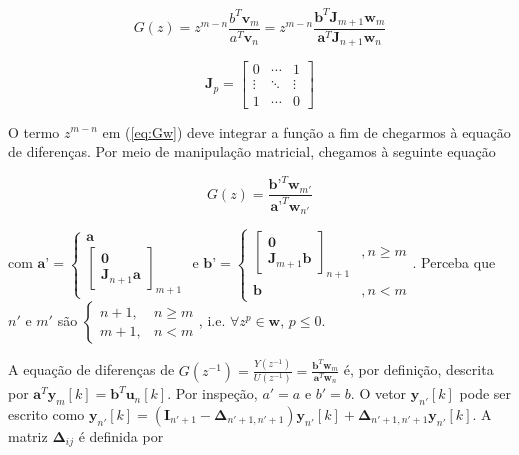 \documentclass[twoside, fleqn]{article}
\begin{document}
        \begin{equation}
            G(z) = z^{m-n}\frac{b^T \textbf{v}_m}{a^T \textbf{v}_n} = z^{m-n} \frac{\textbf{b}^T \textbf{J}_{m+1} \textbf{w}_m}{\textbf{a}^T \textbf{J}_{n+1} \textbf{w}_n}
        \label{eq:Gv}
        \end{equation}
    
        \begin{equation}
            \textbf{J}_p = 
            \begin{bmatrix}
                0&\cdots&1\\
                \vdots & \ddots & \vdots\\
                1&\cdots&0
            \end{bmatrix}
            \label{eq:exchange}
        \end{equation}
    
    O termo $z^{m-n}$ em (\ref{eq:Gw}) deve integrar a função a fim de chegarmos à equação de diferenças. Por meio de manipulação matricial, chegamos à seguinte equação 
    
        \begin{equation}
            G(z) = \frac{\textbf{b'}^T \textbf{w}_{m'}}{\textbf{a'}^T \textbf{w}_{n'}}
            \label{eq:Gw}
        \end{equation}
    
    com $\textbf{a'} = \begin{cases} \textbf{a}\\ \begin{bmatrix} \textbf{0} \\ \textbf{J}_{n+1} \textbf{a} \end{bmatrix}_{m+1} \end{cases} \mbox{ e } \textbf{b'} = \begin{cases} \begin{bmatrix} \textbf{0}\\ \textbf{J}_{m+1} \textbf{b} \end{bmatrix}_{n+1} &, n \geq m \\ \textbf{b} &,  n < m \end{cases}$. Perceba que $n'$ e $m'$ são $\begin{cases} n + 1,& n \geq m \\ m + 1, & n < m \end{cases}$, i.e. $\forall z^p \in \textbf{w} \mbox{, } p \leq 0$. 
    
    A equação de diferenças de $G(z^{-1}) = \frac{Y(z^{-1})}{U(z^{-1})} = \frac{\textbf{b}^T \textbf{w}_{m}}{\textbf{a}^T \textbf{w}_{n}}$ é, por definição, descrita por $\textbf{a}^T \textbf{y}_{m}[k] = \textbf{b}^T \textbf{u}_{n}[k]$. Por inspeção, $a' = a$ e $b' = b$. O vetor $\textbf{y}_{n'}[k]$ pode ser escrito como $\textbf{y}_{n'}[k] = \left(\textbf{I}_{n' + 1} - \mathbf{\Delta}_{n'+1, n'+1}\right) \mathbf{y}_{n'}[k] + \mathbf{\Delta}_{n'+1, n'+1} \mathbf{y}_{n'}[k]$. A matriz $\mathbf{\Delta}_{ij}$ é definida por 
    
\end{document}
